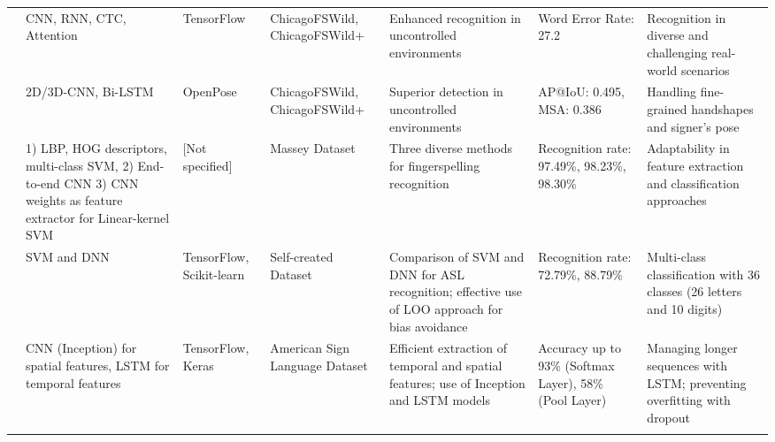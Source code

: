 \begin{longtable}{p{}p{}p{}p{}p{}p{}p{}}
    \cite{shiFingerspellingRecognitionWild2019}        & CNN, RNN, CTC, Attention                                                                                              & TensorFlow               & ChicagoFSWild, ChicagoFSWild+  & Enhanced recognition in uncontrolled environments                                               & Word Error Rate: 27.2                                  & Recognition in diverse and challenging real-world scenarios              \\

    \cite{shiFingerspellingDetectionAmerican2021}      & 2D/3D-CNN, Bi-LSTM                                                                                                    & OpenPose                 & ChicagoFSWild, ChicagoFSWild+  & Superior detection in uncontrolled environments                                                 & AP@IoU: 0.495, MSA: 0.386                              & Handling fine-grained handshapes and signer’s pose                       \\

    \cite{nguyenDeepLearningAmerican2019}              & 1) LBP, HOG descriptors, multi-class SVM, 2) End-to-end CNN 3) CNN weights as feature extractor for Linear-kernel SVM & [Not specified]          & Massey Dataset                 & Three diverse methods for fingerspelling recognition                                            & Recognition rate: 97.49\%, 98.23\%, 98.30\%            & Adaptability in feature extraction and classification approaches         \\

    \cite{chongAmericanSignLanguage2018}               & SVM and DNN                                                                                                           & TensorFlow, Scikit-learn & Self-created Dataset           & Comparison of SVM and DNN for ASL recognition; effective use of LOO approach for bias avoidance & Recognition rate: 72.79\%, 88.79\%                     & Multi-class classification with 36 classes (26 letters and 10 digits)    \\

    \cite{bantupalliAmericanSignLanguage2018}          & CNN (Inception) for spatial features, LSTM for temporal features                                                      & TensorFlow, Keras        & American Sign Language Dataset & Efficient extraction of temporal and spatial features; use of Inception and LSTM models         & Accuracy up to 93\% (Softmax Layer), 58\% (Pool Layer) & Managing longer sequences with LSTM; preventing overfitting with dropout \\                                                                                                                                                                                                                                                                                                                                                                                                                                         \\*
    \bottomrule
\end{longtable}